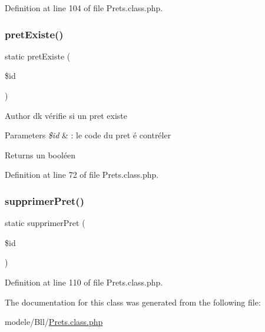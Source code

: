 Definition at line 104 of file Prets.\+class.\+php.

\mbox{\label{class_prets_ae2e15f8376a62a7e410b70431a365e4f}} 
\subsubsection{\texorpdfstring{pret\+Existe()}{pretExiste()}}
{\footnotesize\ttfamily static pret\+Existe (\begin{DoxyParamCaption}\item[{}]{\$id }\end{DoxyParamCaption})\hspace{0.3cm}{\ttfamily [static]}}

\begin{DoxyAuthor}{Author}
dk vérifie si un pret existe 
\end{DoxyAuthor}

\begin{DoxyParams}{Parameters}
{\em \$id} & \+: le code du pret é contréler \\
\hline
\end{DoxyParams}
\begin{DoxyReturn}{Returns}
un booléen 
\end{DoxyReturn}


Definition at line 72 of file Prets.\+class.\+php.

\mbox{\label{class_prets_a319222a4f2442b93068fadd2a5bb7d2d}} 
\subsubsection{\texorpdfstring{supprimer\+Pret()}{supprimerPret()}}
{\footnotesize\ttfamily static supprimer\+Pret (\begin{DoxyParamCaption}\item[{}]{\$id }\end{DoxyParamCaption})\hspace{0.3cm}{\ttfamily [static]}}



Definition at line 110 of file Prets.\+class.\+php.



The documentation for this class was generated from the following file\+:\begin{DoxyCompactItemize}
\item 
modele/\+Bll/\hyperlink{_prets_8class_8php}{Prets.\+class.\+php}\end{DoxyCompactItemize}
